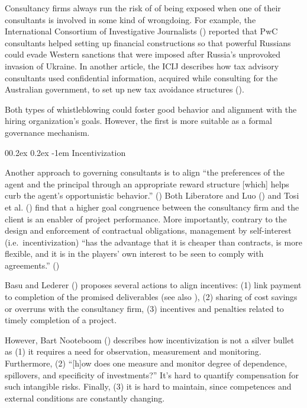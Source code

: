 \documentclass[
  man,floatsintext]{apa6}
\makeatletter
\let\oldparagraph\paragraph
\renewcommand{\paragraph}[1]{\oldparagraph{#1}\mbox{}}
\renewcommand{\paragraph}{\@startsection{paragraph}{4}{\parindent}%
  {0\baselineskip \@plus 0.2ex \@minus 0.2ex}%
  {-1em}%
  {\normalfont\normalsize\bfseries\itshape\typesectitle}}
\makeatother
\begin{document}
Consultancy firms always run the risk of of being exposed when one of their consultants is involved in some kind of wrongdoing. For example, the International Consortium of Investigative Journalists () reported that PwC consultants helped setting up financial constructions so that powerful Russians could evade Western sanctions that were imposed after Russia's unprovoked invasion of Ukraine. In another article, the ICIJ describes how tax advisory consultants used confidential information, acquired while consulting for the Australian government, to set up new tax avoidance structures ().

Both types of whistleblowing could foster good behavior and alignment with the hiring organization's goals. However, the first is more suitable as a formal governance mechanism.

\paragraph{Incentivization}\label{incentivization}

Another approach to governing consultants is to align ``the preferences of the agent and the principal through an appropriate reward structure {[}which{]} helps curb the agent's opportunistic behavior.'' () Both Liberatore and Luo () and Tosi et al. () find that a higher goal congruence between the consultancy firm and the client is an enabler of project performance. More importantly, contrary to the design and enforcement of contractual obligations, management by self-interest (i.e.~incentivization) ``has the advantage that it is cheaper than contracts, is more flexible, and it is in the players' own interest to be seen to comply with agreements.'' ()

Basu and Lederer () proposes several actions to align incentives: (1) link payment to completion of the promised deliverables (see also ), (2) sharing of cost savings or overruns with the consultancy firm, (3) incentives and penalties related to timely completion of a project.

However, Bart Nooteboom () describes how incentivization is not a silver bullet as (1) it requires a need for observation, measurement and monitoring. Furthermore, (2) ``{[}h{]}ow does one measure and monitor degree of dependence, spillovers, and specificity of investments?'' It's hard to quantify compensation for such intangible risks. Finally, (3) it is hard to maintain, since competences and external conditions are constantly changing.
\end{document}
